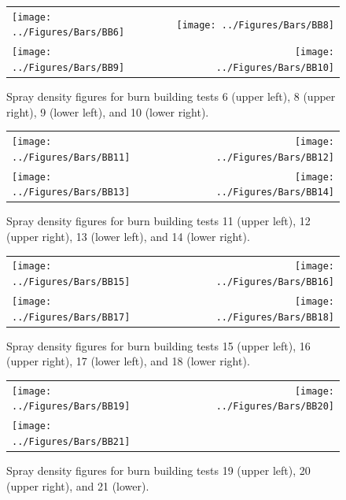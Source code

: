 \documentclass[12pt,oneside]{book}
\begin{document}
\clearpage

\begin{figure}[ht]
\begin{tabular*}{\textwidth}{lr}
\texttt{[image: ../Figures/Bars/BB6]} &
\texttt{[image: ../Figures/Bars/BB8]} \\
\texttt{[image: ../Figures/Bars/BB9]} &
\texttt{[image: ../Figures/Bars/BB10]}
\end{tabular*}
\caption{Spray density figures for burn building tests 6 (upper left), 8 (upper right), 9 (lower left), and 10 (lower right).}
\label{fig:bb_6_10}
\end{figure}

\clearpage

\begin{figure}[ht]
\begin{tabular*}{\textwidth}{lr}
\texttt{[image: ../Figures/Bars/BB11]} &
\texttt{[image: ../Figures/Bars/BB12]} \\
\texttt{[image: ../Figures/Bars/BB13]} &
\texttt{[image: ../Figures/Bars/BB14]}
\end{tabular*}
\caption{Spray density figures for burn building tests 11 (upper left), 12 (upper right), 13 (lower left), and 14 (lower right).}
\label{fig:bb_11_14}
\end{figure}

\clearpage

\begin{figure}[ht]
\begin{tabular*}{\textwidth}{lr}
\texttt{[image: ../Figures/Bars/BB15]} &
\texttt{[image: ../Figures/Bars/BB16]} \\
\texttt{[image: ../Figures/Bars/BB17]} &
\texttt{[image: ../Figures/Bars/BB18]}
\end{tabular*}
\caption{Spray density figures for burn building tests 15 (upper left), 16 (upper right), 17 (lower left), and 18 (lower right).}
\label{fig:bb_15_18}
\end{figure}

\clearpage

\begin{figure}[ht]
\begin{tabular*}{\textwidth}{lr}
\texttt{[image: ../Figures/Bars/BB19]} &
\texttt{[image: ../Figures/Bars/BB20]} \\
\texttt{[image: ../Figures/Bars/BB21]} \\
\end{tabular*}
\caption{Spray density figures for burn building tests 19 (upper left), 20 (upper right), and 21 (lower).}
\label{fig:bb_19_21}
\end{figure}
\end{document}
